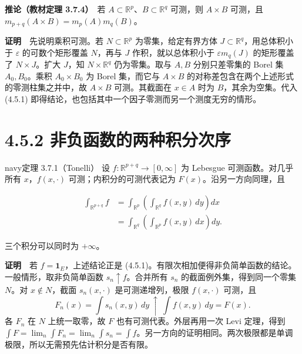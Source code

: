 \documentclass[11pt,a4paper]{article}
\begin{document}
\textbf{推论（教材定理 3.7.4）}　若
\(A\subset\mathbb R^p\)、\(B\subset\mathbb R^q\) 可测，则 \(A\times B\)
可测，且 \(m_{p+q}(A\times B)=m_p(A)m_q(B)\)。

\textbf{证明}　先说明乘积可测。若 \(N\subset\mathbb R^p\)
为零集，给定有界方体 \(J\subset\mathbb R^q\)，用总体积小于
\(\varepsilon\) 的可数个矩形覆盖 \(N\)，再与 \(J\) 作积，就以总体积小于
\(\varepsilon m_q(J)\) 的矩形覆盖了 \(N\times J\)。扩大 \(J\)，知
\(N\times\mathbb R^q\) 仍为零集。取与 \(A,B\) 分别只差零集的 Borel 集
\(A_0,B_0\)。乘积 \(A_0\times B_0\) 为 Borel 集，而它与 \(A\times B\)
的对称差包含在两个上述形式的零测柱集之并中，故 \(A\times B\)
可测。其截面在 \(x\in A\) 时为 \(B\)，其余为空集。代入 (4.5.1)
即得结论，也包括其中一个因子零测而另一个测度无穷的情形。

\section[\S{}4.5.2
非负函数的两种积分次序]{4.5.2
非负函数的两种积分次序}\label{ux975eux8d1fux51fdux6570ux7684ux4e24ux79cdux79efux5206ux6b21ux5e8f}

\begin{sboxenv}{navy}{定理 3.7.1（Tonelli）}
设 \(f:\mathbb R^{p+q}\to[0,\infty]\) 为 Lebesgue 可测函数。对几乎所有
\(x\)，\(f(x,\cdot)\) 可测；内积分的可测代表记为
\(F(x)\)。沿另一方向同理，且

\begin{equation*}
\begin{aligned}
\int_{\mathbb R^{p+q}}f
&=\int_{\mathbb R^p}\left(\int_{\mathbb R^q}f(x,y)\,dy\right)dx\\
&=\int_{\mathbb R^q}\left(\int_{\mathbb R^p}f(x,y)\,dx\right)dy .
\end{aligned}
\tag{4.5.2}
\end{equation*}

三个积分可以同时为 \(+\infty\)。

\end{sboxenv}

\textbf{证明}　若 \(f=\mathbf1_E\)，上述结论正是
(4.5.1)。有限次相加便得非负简单函数的结论。一般情形，取非负简单函数
\(s_n\uparrow f\)。合并所有 \(s_n\) 的截面例外集，得到同一个零集
\(N\)。对 \(x\notin N\)，截面 \(s_n(x,\cdot)\) 是可测递增列，极限
\(f(x,\cdot)\) 可测，且 \begin{equation*}
F_n(x)=\int s_n(x,y)\,dy \ \uparrow\ \int f(x,y)\,dy=F(x).
\end{equation*} 各 \(F_n\) 在 \(N\) 上统一取零，故 \(F\) 也有可测代表。外层再用一次
Levi 定理，得到
\(\int F=\lim_n\int F_n=\lim_n\int s_n=\int f\)。另一方向的证明相同。两次极限都是单调极限，所以无需预先估计积分是否有限。
\end{document}
